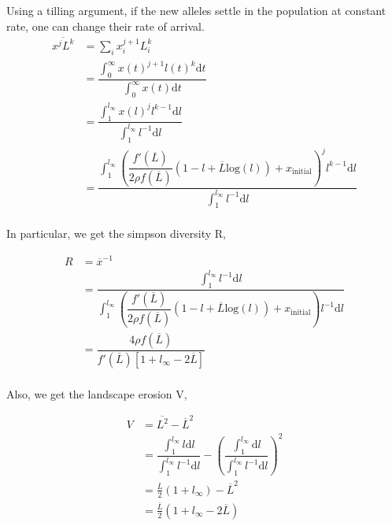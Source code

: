\documentclass{article}
\begin{document}
Using a tilling argument, if the new alleles settle in the population at constant rate, one can change their rate of arrival.
\begin{equation}
  \begin{aligned}
    \overline{x^{j} L^{k}} &= \sum_i x_i^{j+1} L_i^{k} \\
    &= \dfrac{ \int_{0}^{\infty} x(t)^{j+1} l(t)^{k} \mathrm{d} t }{ \int_{0}^{\infty} x(t) \mathrm{d} t }
    \\
    &= \dfrac{ \int_{1}^{l_{\infty}} x(l)^{j} l^{k-1} \mathrm{d} l  }{ \int_{1}^{l_{\infty}} l^{-1} \mathrm{d} l }
    \\
    &= \dfrac{ \int_{1}^{l_{\infty}} \left( \dfrac{f'(\overline{L})}{2 \rho f(\overline{L})} (1-l + \overline{L} \mathrm{log}(l)) + x_{\mathrm{initial}}  \right)^{j} l^{k-1} \mathrm{d} l  }{ \int_{1}^{l_{\infty}} l^{-1} \mathrm{d} l }
    \\
  \end{aligned}
\end{equation}

In particular, we get the simpson diversity R,

\begin{equation}
  \begin{aligned}
    R &= \overline{x}^{-1} \\
    &=  \dfrac{ \int_{1}^{l_{\infty}} l^{-1} \mathrm{d} l }{ \int_{1}^{l_{\infty}} \left( \dfrac{f'(\overline{L})}{2 \rho f(\overline{L})} (1-l + \overline{L} \mathrm{log}(l)) + x_{\mathrm{initial}}  \right) l^{-1} \mathrm{d} l } 
    \\
    &= \dfrac{4 \rho f(\overline{L})}{f'(\overline{L})\left[ 1 + l_{\infty} - 2 \overline{L}  \right]} 
    \\
  \end{aligned}
\end{equation}

Also, we get the landscape erosion V,

\begin{equation}
  \begin{aligned}
    V &=  \overline{L^2} - \overline{L}^2 \\
    &= \dfrac{ \int_{1}^{l_{\infty}} l \mathrm{d} l  }{ \int_{1}^{l_{\infty}} l^{-1} \mathrm{d} l } - \left( \dfrac{ \int_{1}^{l_{\infty}} \mathrm{d} l  }{ \int_{1}^{l_{\infty}} l^{-1} \mathrm{d} l } \right)^2
    \\
    &= \frac{\overline{L}}{2}  \left(1 + l_{\infty}\right) - \overline{L}^2
    \\
    &= \frac{\overline{L}}{2}  \left(1 + l_{\infty} - 2 \overline{L}\right)
    \\
  \end{aligned}
\end{equation}
\end{document}
